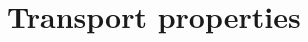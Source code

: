 \documentclass[final,3p,times,twocolumn]{elsarticle}
\begin{document}
                                                                                                                                                                                                                                                                                                                                                                                                                                                                                                                                                                                                                                                                                                                                      


\section{Transport properties}\label{transportProp}
\end{document}
